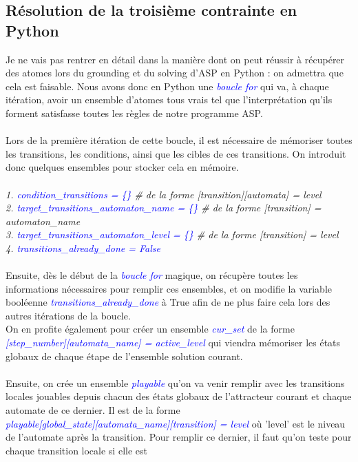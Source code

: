\documentclass[10pt,a4paper]{article}
\begin{document}
\subsection{Résolution de la troisième contrainte en Python}
Je ne vais pas rentrer en détail dans la manière dont on peut réussir à récupérer des atomes lors du grounding et du solving d'ASP en Python : on admettra que cela est faisable. Nous avons donc en Python une 
\textcolor{blue}{\emph{boucle for}} qui va, à chaque itération, avoir un ensemble d'atomes tous vrais tel que l'interprétation qu'ils forment satisfasse toutes les règles de notre programme ASP.\\ \\
Lors de la première itération de cette boucle, il est nécessaire de mémoriser toutes les transitions, les conditions, ainsi que les cibles de ces transitions. On introduit donc quelques ensembles pour stocker cela en mémoire.\\ \\
\emph{
	1. \textcolor{blue}{condition\_transitions = \{\}} \# de la forme [transition][automata] = level\\
	2. \textcolor{blue}{target\_transitions\_automaton\_name = \{\}} \# de la forme [transition] = automaton\_name\\
	3. \textcolor{blue}{target\_transitions\_automaton\_level = \{\}}  \# de la forme [transition] = level\\
	4. \textcolor{blue}{transitions\_already\_done = False}\\ \\
}
Ensuite, dès le début de la \emph{\textcolor{blue}{boucle for}} magique, on récupère toutes les informations nécessaires pour remplir ces ensembles, et on modifie la variable booléenne \emph{\textcolor{blue}
{transitions\_already\_done}} à True afin de ne plus faire cela lors des autres itérations de la boucle.\\
On en profite également pour créer un ensemble \emph{\textcolor{blue}{cur\_set}}  de la forme \emph{\textcolor{blue}{[step\_number][automata\_name] = active\_level}} qui viendra mémoriser les états globaux de chaque étape de 
l'ensemble solution courant.\\ \\
Ensuite, on crée un ensemble \emph{\textcolor{blue}{playable}} qu'on va venir remplir avec les transitions locales jouables depuis chacun des états globaux de l'attracteur courant et chaque automate de ce dernier. Il est de la forme \\
\emph{\textcolor{blue}{playable[global\_state][automata\_name][transition] = level}} où 'level' est le niveau de l'automate après la transition. Pour remplir ce dernier, il faut qu'on teste pour chaque transition locale si elle est 
\end{document}
